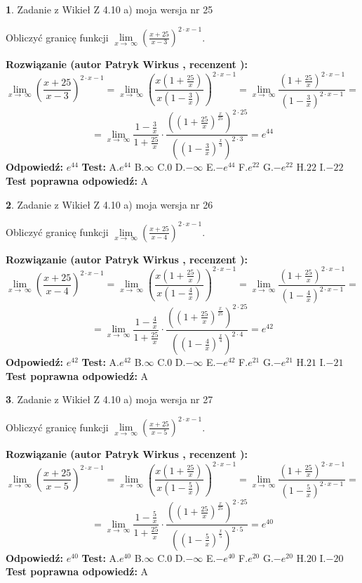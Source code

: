 \documentclass[12pt, a4paper]{article}
\theoremstyle{definition} %
\newtheorem{zad}{}
\newcommand{\zadStart}[1]{\begin{zad}#1\newline}
\newcommand{\zadStop}{\end{zad}}
\newcommand{\rozwStart}[2]{\noindent \textbf{Rozwiązanie (autor #1 , recenzent #2): }\newline}
\newcommand{\rozwStop}{\newline}
\newcommand{\odpStart}{\noindent \textbf{Odpowiedź:}\newline}
\newcommand{\odpStop}{\newline}
\newcommand{\testStart}{\noindent \textbf{Test:}\newline}
\newcommand{\testStop}{\newline}
\newcommand{\kluczStart}{\noindent \textbf{Test poprawna odpowiedź:}\newline}
\newcommand{\kluczStop}{\newline}
\begin{document}
\zadStart{Zadanie z Wikieł Z 4.10 a) moja wersja nr 25}

Obliczyć granicę funkcji  $\lim\limits_{x\to\ \infty}(\frac{x+25}{x-3})^{2\cdot x-1}$.
\zadStop
\rozwStart{Patryk Wirkus}{}
$$\lim\limits_{x\to\ \infty}(\frac{x+25}{x-3})^{2\cdot x-1} = \lim\limits_{x\to\ \infty}(\frac{x(1+\frac{25}{x})}{x(1-\frac{3}{x})})^{2\cdot x-1}=\lim\limits_{x\to\ \infty}\frac{(1+\frac{25}{x})^{2\cdot x-1}}{(1-\frac{3}{x})^{2\cdot x-1}}=$$
$$=\lim\limits_{x\to\ \infty}\frac{1-\frac{3}{x}}{1+\frac{25}{x}}\cdot\frac{((1+\frac{25}{x})^{\frac{x}{25}})^{2\cdot25}}{((1-\frac{3}{x})^{\frac{x}{3}})^{2\cdot3}}=e^{44}$$
\rozwStop
\odpStart
$e^{44}$
\odpStop
\testStart
A.$e^{44}$ B.$\infty$ C.$0$ D.$-\infty$ E.$-e^{44}$
F.$e^{22}$ G.$-e^{22}$
H.$22$
I.$-22$
\testStop
\kluczStart
A
\kluczStop



\zadStart{Zadanie z Wikieł Z 4.10 a) moja wersja nr 26}

Obliczyć granicę funkcji  $\lim\limits_{x\to\ \infty}(\frac{x+25}{x-4})^{2\cdot x-1}$.
\zadStop
\rozwStart{Patryk Wirkus}{}
$$\lim\limits_{x\to\ \infty}(\frac{x+25}{x-4})^{2\cdot x-1} = \lim\limits_{x\to\ \infty}(\frac{x(1+\frac{25}{x})}{x(1-\frac{4}{x})})^{2\cdot x-1}=\lim\limits_{x\to\ \infty}\frac{(1+\frac{25}{x})^{2\cdot x-1}}{(1-\frac{4}{x})^{2\cdot x-1}}=$$
$$=\lim\limits_{x\to\ \infty}\frac{1-\frac{4}{x}}{1+\frac{25}{x}}\cdot\frac{((1+\frac{25}{x})^{\frac{x}{25}})^{2\cdot25}}{((1-\frac{4}{x})^{\frac{x}{4}})^{2\cdot4}}=e^{42}$$
\rozwStop
\odpStart
$e^{42}$
\odpStop
\testStart
A.$e^{42}$ B.$\infty$ C.$0$ D.$-\infty$ E.$-e^{42}$
F.$e^{21}$ G.$-e^{21}$
H.$21$
I.$-21$
\testStop
\kluczStart
A
\kluczStop



\zadStart{Zadanie z Wikieł Z 4.10 a) moja wersja nr 27}

Obliczyć granicę funkcji  $\lim\limits_{x\to\ \infty}(\frac{x+25}{x-5})^{2\cdot x-1}$.
\zadStop
\rozwStart{Patryk Wirkus}{}
$$\lim\limits_{x\to\ \infty}(\frac{x+25}{x-5})^{2\cdot x-1} = \lim\limits_{x\to\ \infty}(\frac{x(1+\frac{25}{x})}{x(1-\frac{5}{x})})^{2\cdot x-1}=\lim\limits_{x\to\ \infty}\frac{(1+\frac{25}{x})^{2\cdot x-1}}{(1-\frac{5}{x})^{2\cdot x-1}}=$$
$$=\lim\limits_{x\to\ \infty}\frac{1-\frac{5}{x}}{1+\frac{25}{x}}\cdot\frac{((1+\frac{25}{x})^{\frac{x}{25}})^{2\cdot25}}{((1-\frac{5}{x})^{\frac{x}{5}})^{2\cdot5}}=e^{40}$$
\rozwStop
\odpStart
$e^{40}$
\odpStop
\testStart
A.$e^{40}$ B.$\infty$ C.$0$ D.$-\infty$ E.$-e^{40}$
F.$e^{20}$ G.$-e^{20}$
H.$20$
I.$-20$
\testStop
\kluczStart
A
\kluczStop
\end{document}
